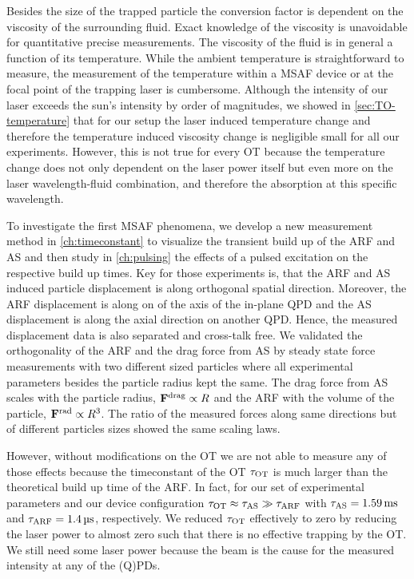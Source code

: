 Besides the size of the trapped particle the conversion factor is dependent on 
the viscosity of the surrounding fluid. Exact knowledge of the viscosity is 
unavoidable for quantitative precise measurements. The viscosity of the fluid 
is in general a function of its temperature. While the ambient temperature is 
straightforward to measure, the measurement of the temperature within a MSAF 
device or at the focal point of the trapping laser is cumbersome. Although the 
intensity of our laser exceeds the sun's intensity by order of magnitudes, we 
showed in \cref{sec:TO-temperature} that for our setup the laser induced 
temperature change and therefore the temperature induced viscosity change is 
negligible small for all our experiments. However, this is not true for every 
OT because the temperature change does not only dependent on the laser power 
itself but even more on the laser wavelength-fluid combination, and therefore 
the absorption at this specific wavelength.

To investigate the first MSAF phenomena, we develop a new measurement method in 
\cref{ch:timeconstant} to visualize the transient build up of the ARF and AS 
and then study in \cref{ch:pulsing} the effects of a pulsed excitation on the 
respective build up times. Key for those experiments is, that the ARF and AS 
induced particle displacement is along orthogonal spatial direction. Moreover, 
the ARF displacement is along on of the axis of the in-plane QPD and the AS 
displacement is along the axial direction on another QPD. Hence, the measured 
displacement data is also separated and cross-talk free. We validated the 
orthogonality of the ARF and the drag force from AS by steady state force 
measurements with two different sized particles where all experimental 
parameters besides the particle radius kept the same. The drag force from AS 
scales with the particle radius, $\vb{F}^{\mathrm{drag}}\propto R$ and the ARF with the volume of 
the particle, $\vb{F}^{\mathrm{rad}}\propto R^{3}$. The ratio of the measured forces along same 
directions but of different particles sizes showed the same scaling laws. 

However, without modifications on the OT we are not able to measure any of 
those effects because the timeconstant of the OT $\tau_{\mathrm{OT}}$ is much larger than the 
theoretical build up time of the ARF. In fact, for our set of experimental 
parameters and our device configuration $\tau_{\mathrm{OT}} \approx \tau_{\mathrm{AS}} \gg \tau_{\mathrm{ARF}}$ with 
$\tas = \SI{1.59}{\ms}$ and $\tarf = \SI{1.4}{\us}$, respectively. We reduced 
$\tau_{\mathrm{OT}}$ effectively to zero by reducing the laser power to almost zero such that 
there is no effective trapping by the OT. We still need some laser power 
because the beam is the cause for the measured intensity at any of the (Q)PDs.


